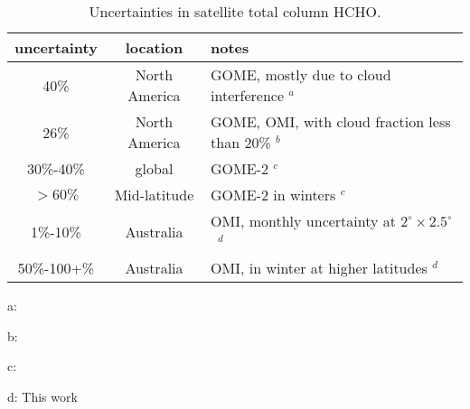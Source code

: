 \documentclass[acp, manuscript]{copernicus}
\newcommand{\textcite}{\citet}
\newcommand{\lowhr}{$2^{\circ} \times 2.5^{\circ}$}
\begin{document}
    \begin{table}\begin{threeparttable}
        \caption{Uncertainties in satellite total column HCHO.}
        \begin{tabular}{ c  c l } 
          \toprule
          uncertainty & location & notes \\
          \midrule
          40\% & North America & GOME, mostly due to cloud interference $^a$ \\
          26\% & North America & GOME, OMI, with cloud fraction less than 20\% $^b$  \\
          30\%-40\% & global & GOME-2  $^c$ \\
          $>60\%$ & Mid-latitude & GOME-2 in winters $^c$ \\
          1\%-10\% & Australia & OMI, monthly uncertainty at \lowhr ~$^d$ \\
          50\%-100+\% & Australia & OMI, in winter at higher latitudes $^d$ \\
          \bottomrule
        \end{tabular}
        \begin{tablenotes}
          \small
          \item a: \textcite{Millet2006,Palmer2006}
          \item b: \textcite{Millet2008}
          \item c: \textcite{DeSmedt2008,DeSmedt2012}
          \item d: This work
        \end{tablenotes}
        \label{BioIsop:uncertainty:eomi:tab_lit_uncertainties}
    \end{threeparttable}\end{table}
    
\end{document}
